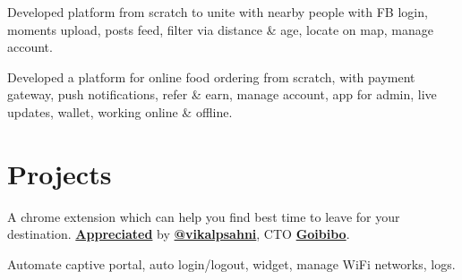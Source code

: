\documentclass[a4paper]{deedy-resume} %
\begin{document}
\begin{minipage}[t]{0.66\textwidth}
    
    
    Developed platform from scratch to unite with nearby people with FB login, moments upload, posts feed, filter via distance \& age, locate on map, manage account.
    
    \sectionspace %
    
    
    
    Developed a platform for online food ordering from scratch, with payment gateway, push notifications, refer \& earn, manage account, app for admin, live updates, wallet, working online \& offline.
    
    \sectionspace %
    
    
    \section{Projects}
    
    
    A chrome extension which can help you find best time to leave for your destination. \href{https://twitter.com/vikalpsahni/status/1014346010200559617}{\bf Appreciated} by \href{https://twitter.com/vikalpsahni}{\bf @vikalpsahni}, CTO \href{https://goibibo.com}{\bf Goibibo}.
    
    \sectionspace %
    
    
    Automate captive portal, auto login/logout, widget, manage WiFi networks, logs.
    

\end{minipage}
\end{document}
